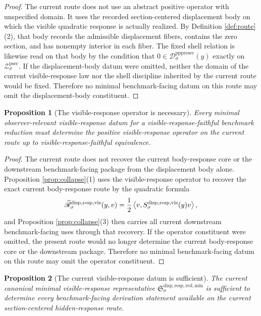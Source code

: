 \documentclass[11pt]{article}
\newcommand{\ProtoSectionShell}[1]{\mathcal Z_{#1}^{\mathrm{psec}}}
\newcommand{\PrePreProtoSectionResidualBody}[1]{\mathcal D_{#1}^{\mathrm{pppresec}}}
\newcommand{\CoreForcedBodyResponse}[1]{\widehat{\mathscr R}_{#1}^{\mathrm{disp,resp,vis}}}
\newcommand{\VisibleResponseOperator}[1]{S_{#1}^{\mathrm{disp,resp,vis}}}
\newcommand{\MinimalReducedStructure}{\mathfrak S^{\mathrm{disp,resp,red,min}}}
\newtheorem{proposition}{Proposition}
\begin{document}
\begin{proof}
The current route does not use an abstract positive operator with unspecified domain. It uses the recorded section-centered displacement body on which the visible quadratic response is actually realized. By Definition \ref{def:route}(2), that body records the admissible displacement fibers, contains the zero section, and has nonempty interior in each fiber. The fixed shell relation is likewise read on that body by the condition that \(0\in\PrePreProtoSectionResidualBody{\sigma}(y)\) exactly on \(\ProtoSectionShell{\sigma}\). If the displacement-body datum were omitted, neither the domain of the current visible-response law nor the shell discipline inherited by the current route would be fixed. Therefore no minimal benchmark-facing datum on this route may omit the displacement-body constituent.
\end{proof}

\begin{proposition}[The visible-response operator is necessary]
\label{prop:operator}
Every minimal observer-relevant visible-response datum for a visible-response-faithful benchmark reduction must determine the positive visible-response operator on the current route up to visible-response-faithful equivalence.
\end{proposition}

\begin{proof}
The current route does not recover the current body-response core or the downstream benchmark-facing package from the displacement body alone. Proposition \ref{prop:collapse}(1) uses the visible-response operator to recover the exact current body-response route by the quadratic formula
\[
\CoreForcedBodyResponse{\sigma}(y,v)
=
\frac{1}{2}
\ev{v,\VisibleResponseOperator{\sigma}(y)v},
\]
and Proposition \ref{prop:collapse}(3) then carries all current downstream benchmark-facing uses through that recovery. If the operator constituent were omitted, the present route would no longer determine the current body-response core or the downstream package. Therefore no minimal benchmark-facing datum on this route may omit the operator constituent.
\end{proof}

\begin{proposition}[The current visible-response datum is sufficient]
\label{prop:sufficient}
The current canonical minimal visible-response representative \(\MinimalReducedStructure_{\sigma}\) is sufficient to determine every benchmark-facing derivation statement available on the current section-centered hidden-response route.
\end{proposition}
\end{document}
